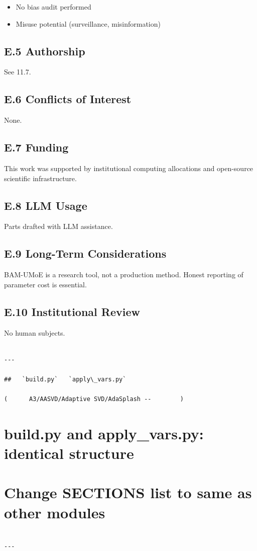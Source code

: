 \begin{itemize}
\item No bias audit performed
\item Misuse potential (surveillance, misinformation)

\end{itemize}
\subsection{E.5 Authorship}

See  11.7.

\subsection{E.6 Conflicts of Interest}

None.

\subsection{E.7 Funding}

This work was supported by institutional computing allocations and open-source scientific infrastructure.

\subsection{E.8 LLM Usage}

Parts drafted with LLM assistance.

\subsection{E.9 Long-Term Considerations}

BAM-UMoE is a research tool, not a production method. Honest reporting 
of parameter cost is essential.

\subsection{E.10 Institutional Review}

No human subjects.
\begin{lstlisting}

---

##   `build.py`   `apply\_vars.py`

(      A3/AASVD/Adaptive SVD/AdaSplash --        )

\end{lstlisting}
\section{build.py and apply\_vars.py: identical structure}
\section{Change SECTIONS list to same as other modules}
\begin{lstlisting}

---
\end{lstlisting}
